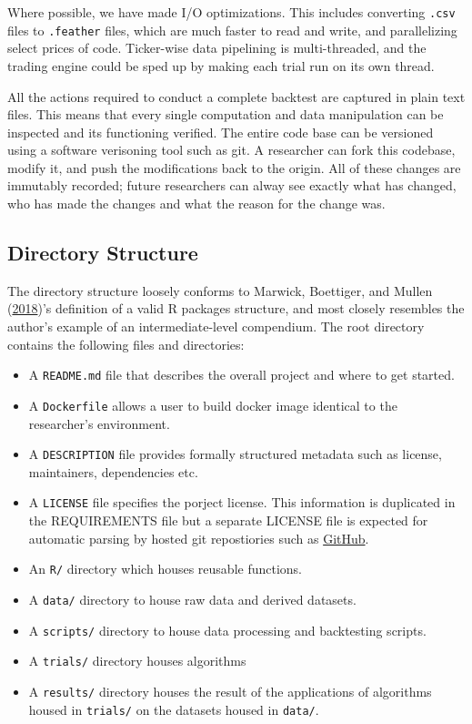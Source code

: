 \documentclass[11pt,preprint, authoryear]{elsarticle}
\numberwithin{equation}{section}
\numberwithin{figure}{section}
\numberwithin{table}{section}
\def\tightlist{} %
\begin{document}
Where possible, we have made I/O optimizations. This includes converting
\texttt{.csv} files to \texttt{.feather} files, which are much faster to
read and write, and parallelizing select prices of code. Ticker-wise
data pipelining is multi-threaded, and the trading engine could be sped
up by making each trial run on its own thread.

All the actions required to conduct a complete backtest are captured in
plain text files. This means that every single computation and data
manipulation can be inspected and its functioning verified. The entire
code base can be versioned using a software verisoning tool such as git.
A researcher can fork this codebase, modify it, and push the
modifications back to the origin. All of these changes are immutably
recorded; future researchers can alway see exactly what has changed, who
has made the changes and what the reason for the change was.

\subsection{Directory Structure}\label{directory-structure}

The directory structure loosely conforms to Marwick, Boettiger, and
Mullen (\protect\hyperlink{ref-Marwick2018}{2018})'s definition of a
valid R packages structure, and most closely resembles the author's
example of an intermediate-level compendium. The root directory contains
the following files and directories:

\begin{itemize}
\tightlist
\item
  A \texttt{README.md} file that describes the overall project and where
  to get started.
\item
  A \texttt{Dockerfile} allows a user to build docker image identical to
  the researcher's environment.
\item
  A \texttt{DESCRIPTION} file provides formally structured metadata such
  as license, maintainers, dependencies etc.
\item
  A \texttt{LICENSE} file specifies the porject license. This
  information is duplicated in the REQUIREMENTS file but a separate
  LICENSE file is expected for automatic parsing by hosted git
  repostiories such as \href{https://github.com}{GitHub}.
\item
  An \texttt{R/} directory which houses reusable functions.
\item
  A \texttt{data/} directory to house raw data and derived datasets.
\item
  A \texttt{scripts/} directory to house data processing and backtesting
  scripts.
\item
  A \texttt{trials/} directory houses algorithms
\item
  A \texttt{results/} directory houses the result of the applications of
  algorithms housed in \texttt{trials/} on the datasets housed in
  \texttt{data/}.
\end{itemize}
\end{document}
